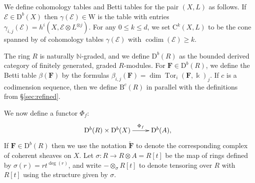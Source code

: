 \documentclass[12pt]{amsart}
\theoremstyle{definition}
\theoremstyle{remark}
\newcommand{\Tor}{\operatorname{Tor}}
\newcommand{\kk}{\Bbbk}
\newcommand{\codim}{\operatorname{codim}}
\newcommand{\WW}{\mathrm{W}}
\newcommand{\NN}{\mathbb{N}}
\newcommand{\cc}{c}
\newcommand{\cE}{\mathcal{E}}
\newcommand{\FF}{\mathbf{F}}
\newcommand{\DD}{\mathrm{D}}
\newcommand{\CQ}{\mathrm{C}}
\newcommand{\BBQ}{\mathrm{B}}
\begin{document}
We define cohomology tables and Betti tables for the pair $(X,L)$ as follows. If $\cE\in \DD^b(X)$ then $\gamma(\cE)\in \WW$ is the table with entries $\gamma_{i,j}(\cE)=h^i(X,\cE\otimes L^{\otimes j})$.  For any $0\leq k \leq d$, we set $\CQ^{k}(X,L)$ to be the cone spanned by of cohomology tables $\gamma(\cE)$ with $\codim(\cE)\geq k$.

The ring $R$ is naturally $\NN$-graded, and we define $\DD^b(R)$ as the bounded derived category of finitely generated, graded $R$-modules.  For $\FF\in \DD^b(R)$, we define the Betti table $\beta(\FF)$ by the formulas $\beta_{i,j}(\FF)=\dim \Tor_i(\FF,\kk)_j$.  If $\cc$ is a codimension sequence, then we define $\BBQ^{\cc}(R)$ in parallel with the definitions from \S\ref{sec:refined}.

We now define a functor $\Phi_f$:
\[
\xymatrix{\DD^{b}(R)\times \DD^{b}(X)  \ar[r]^-{\Phi_f}&\DD^{b}(A),}
\]
If $\FF \in \DD^b(R)$ then we use the notation $\widetilde{\FF}$ to denote the corresponding complex of coherent sheaves on $X$.
Let $\sigma: R\to R\otimes A=R[t]$ be the map of rings defined by $\sigma(r)=rt^{\deg(r)}$, and
write $-\otimes_\sigma R[t]$ to denote tensoring over $R$ with $R[t]$ using the structure
given by $\sigma$. 
\end{document}
